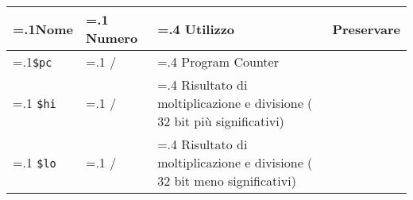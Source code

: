 \documentclass[varwidth=6in]{standalone}
\newcommand\lightrule{%
	\arrayrulecolor{black!30}%
	\midrule[\lightrulewidth]%
	\arrayrulecolor{black}}
\newcommand\register[1]{%
	\texttt{#1}%
}
\begin{document}
	\begin{tabularx}{\textwidth}{ >{\hsize=.1\textwidth}X >{\hsize=.1\textwidth}X >{\hsize=.4\textwidth}X X }
		\toprule
			Nome & Numero & Utilizzo & Preservare \\
		\midrule
			\register{\$pc} & / & Program Counter \\\lightrule
			\register{\$hi} & / & Risultato di moltiplicazione e divisione (\(32\) bit più significativi)\\\lightrule
			\register{\$lo} & / & Risultato di moltiplicazione e divisione (\(32\) bit meno significativi) \\
		\bottomrule
	\end{tabularx}
\end{document}
